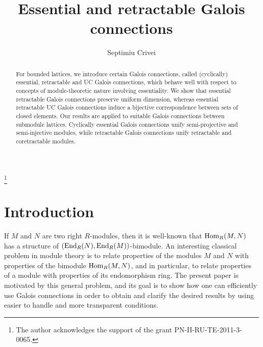 \documentclass[11pt,a4paper]{amsart}
\begin{document}
\title[Galois connections]{Essential and retractable Galois connections}

\author[S. Crivei]{Septimiu Crivei}

\address{Faculty of Mathematics and Computer Science,``Babe\c s-Bolyai" University, Str. Mihail Kog\u alni-ceanu 1,
400084 Cluj-Napoca, Romania} 

 

\begin{abstract} For bounded lattices, we introduce certain Galois connections, called (cyclically) essential,
retractable and UC Galois connections, which behave well with respect to concepts of module-theoretic nature
involving essentiality. We show that  essential retractable Galois connections preserve uniform dimension, whereas
essential retractable UC Galois connections induce a bijective correspondence between sets of closed
elements. Our results are applied to suitable Galois connections between submodule lattices. Cyclically essential Galois
connections unify semi-projective and semi-injective modules, while retractable Galois connections unify retractable and
coretractable modules. 
\end{abstract}

\thanks{The author acknowledges the support of the grant PN-II-RU-TE-2011-3-0065.}

\maketitle

\section{Introduction}

If $M$ and $N$ are two right $R$-modules, then it is well-known that ${{\rm Hom}}_R(M,N)$ has a structure of $({\rm
End}_R(N),{\rm End}_R(M))$-bimodule. An interesting classical problem in module theory is to relate properties of the
modules $M$ and $N$ with properties of the bimodule ${{\rm Hom}}_R(M,N)$, and in particular, to relate properties of a module
with properties of its endomorphism ring. The present paper is motivated by this general problem, and its goal is to
show how one can efficiently use Galois connections in order to obtain and clarify the desired results by using easier
to handle and more transparent conditions. 
\end{document}
